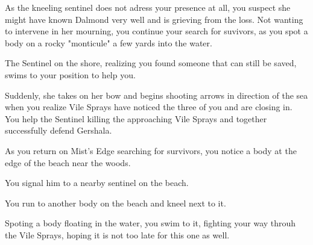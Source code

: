 
As the kneeling sentinel does not adress your presence at all, you suspect she might have known Dalmond very well and is grieving from the loss. Not wanting to intervene in her mourning, you continue your search for suvivors, as you spot a body on a rocky "monticule" a few yards into the water.


The Sentinel on the shore, realizing you found someone that can still be saved, swims to your position to help you.


Suddenly, she takes on her bow and begins shooting arrows in direction of the sea when you realize Vile Sprays have noticed the three of you and are closing in. You help the Sentinel killing the approaching Vile Sprays and together successfully defend Gershala.


As you return on Mist's Edge searching for survivors, you notice a body at the edge of the beach near the woods.


You signal him to a nearby sentinel on the beach.



You run to another body on the beach and kneel next to it.




Spoting a body floating in the water, you swim to it, fighting your way throuh the Vile Sprays, hoping it is not too late for this one as well.

